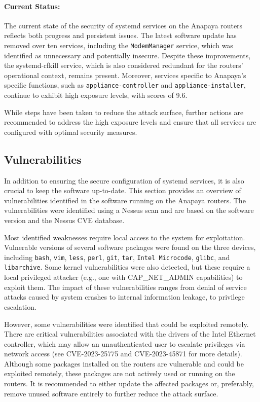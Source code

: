 \paragraph{Current Status:}
The current state of the security of systemd services on the Anapaya routers reflects both progress and persistent issues.
The latest software update has removed over ten services, including the \texttt{ModemManager} service, which was identified as unnecessary and potentially insecure.
Despite these improvements, the systemd-rfkill service, which is also considered redundant for the routers' operational context, remains present.
Moreover, services specific to Anapaya's specific functions, such as \texttt{appliance-controller} and \texttt{appliance-installer}, continue to exhibit high exposure levels, with scores of 9.6.

While steps have been taken to reduce the attack surface, further actions are recommended to address the high exposure levels and ensure that all services are configured with optimal security measures.


\subsection{Vulnerabilities}
\label{sec:vulnerabilities}

In addition to ensuring the secure configuration of systemd services, it is also crucial to keep the software up-to-date.
This section provides an overview of vulnerabilities identified in the software running on the Anapaya routers.
The vulnerabilities were identified using a Nessus scan and are based on the software version and the Nessus CVE database.

Most identified weaknesses require local access to the system for exploitation.
Vulnerable versions of several software packages were found on the three devices, including \texttt{bash}, \texttt{vim}, \texttt{less}, \texttt{perl}, \texttt{git}, \texttt{tar}, \texttt{Intel Microcode}, \texttt{glibc}, and \texttt{libarchive}.
Some kernel vulnerabilities were also detected, but these require a local privileged attacker (e.g., one with CAP\_NET\_ADMIN capabilities) to exploit them.
The impact of these vulnerabilities ranges from denial of service attacks caused by system crashes to internal information leakage, to privilege escalation.

However, some vulnerabilities were identified that could be exploited remotely.
There are critical vulnerabilities associated with the drivers of the Intel Ethernet controller, which may allow an unauthenticated user to escalate privileges via network access (see CVE-2023-25775 and CVE-2023-45871 for more details).
Although some packages installed on the routers are vulnerable and could be exploited remotely, these packages are not actively used or running on the routers.
It is recommended to either update the affected packages or, preferably, remove unused software entirely to further reduce the attack surface.

